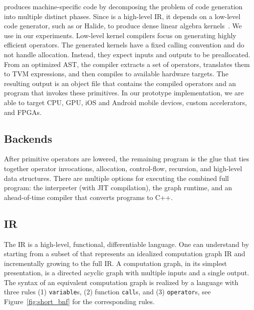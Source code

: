   \relay produces machine-specific code
    by decomposing the problem of code generation into multiple distinct phases.
  Since \relay is a high-level IR, it depends on a low-level code generator,
    such as \tvm or Halide,
    to produce dense linear algebra kernels~\citep{tvm_osdi18, halide}.
  We use \tvm in our experiments.
  Low-level kernel compilers focus on generating highly efficient operators.
  The generated kernels have a fixed calling convention and do not
    handle allocation. Instead, they expect inputs and outputs to be preallocated.
  From an optimized AST,
    the compiler extracts a set of \relay operators,
    translates them to TVM expressions,
    and then compiles to available hardware targets.
  The resulting output is an
    object file that contains the compiled operators
    and an \relay program that invokes these primitives.
  In our prototype implementation,
    we are able to target CPU, GPU,
    iOS and Android mobile devices,
    custom accelerators, and FPGAs.

  \subsection{Backends}
  After primitive operators are lowered,
    the remaining \relay program is the glue that ties
    together operator invocations, allocation, control-flow,
    recursion, and high-level data structures.
  There are multiple options for executing the combined full program:
      the \relay interpreter (with JIT compilation),
      the \tvm graph runtime,
      and an ahead-of-time compiler
      that converts programs to C++.

  \subsection{IR}
  

  The \relay IR is a high-level, functional, differentiable language.
  One can understand \relay by starting from a subset of \relay
    that represents an idealized computation graph IR and
    incrementally growing to the full \relay IR.
  A computation graph, in its simplest presentation, is a directed acyclic
    graph with multiple inputs and a single output.
  The syntax of an equivalent computation graph is realized by
    a language with three rules (1) \verb|variable|s, (2) function \verb|call|s,
    and (3) \verb|operator|s, see Figure~\ref{fig:short_bnf} for the corresponding rules.

